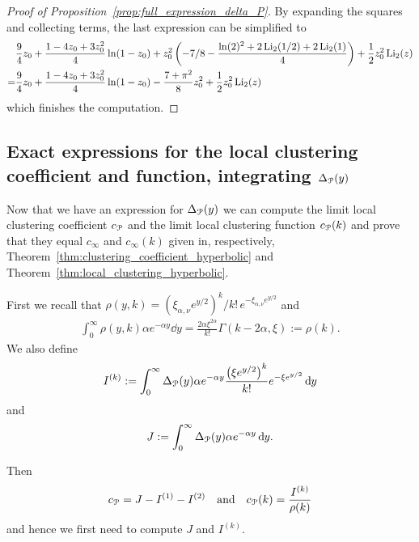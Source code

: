 \begin{proof}[Proof of Proposition~\ref{prop:full_expression_delta_P}]
By expanding the squares and collecting terms, the last expression can be simplified to
\begin{align*}
&\frac{9}{4} z_0 + \frac{1 - 4 z_0 + 3 z_0^2}{4}\ln(1 - z_0) + 
z_0^2 \left(-7/8 - \frac{\ln(2)^2+2\operatorname{Li}_2(1/2) + 2\operatorname{Li}_2(1)}{4} \right) + 
\frac{1}{2}z_0^2 \operatorname{Li}_2(z) \\
=&\frac{9}{4} z_0 + \frac{1 - 4 z_0 + 3 z_0^2}{4}\ln(1 - z_0) - \frac{7+\pi^2}{8}
z_0^2  + 
\frac{1}{2}z_0^2 \operatorname{Li}_2(z)
\end{align*}
which finishes the computation.

\end{proof}

\subsection{Exact expressions for the local clustering coefficient and function, integrating $\Delta_{{\mathcal P}}(y)$}\label{ssec:exact_expressions_clustering_P}

Now that we have an expression for $\Delta_{{\mathcal P}}(y)$ we can compute the limit local clustering coefficient $c_{{\mathcal P}}$ and the limit local clustering function $c_{{\mathcal P}}(k)$ and prove that they equal $c_\infty$ and $c_\infty(k)$ given in, respectively, Theorem~\ref{thm:clustering_coefficient_hyperbolic} and Theorem~\ref{thm:local_clustering_hyperbolic}.


First we recall that $\rho(y,k) = (\xi_{\alpha,\nu} e^{y/2})^k/k! \, e^{-\xi_{\alpha,\nu} e^{y/2}}$ and
\begin{align*}
	\int_0^\infty \rho(y,k) \alpha e^{-\alpha y} \dd y = \frac{2\alpha \xi^{2\alpha}}{k!} \Gamma(k-2\alpha,\xi)
	:= \rho(k).
\end{align*}
We also define
\[
	I^{(k)} := \int_0^{\infty} \Delta_{{\mathcal P}}(y) \alpha e^{-\alpha y} \frac{\left(\xi e^{y/2}\right)^k}{k!} e^{-\xi e^{y/2}} \operatorname{\mathrm{d}\hspace{-2pt}} y
\]
and
\[
	J := \int_0^\infty \Delta_{{\mathcal P}}(y) \alpha e^{-\alpha y} \operatorname{\mathrm{d}\hspace{-2pt}} y.
\]

Then
\[   
	c_{{\mathcal P}} = J - I^{(1)} - I^{(2)} \quad \text{and} \quad
	c_{{\mathcal P}}(k) = \frac{I^{(k)}}{\rho(k)}
\]
and hence we first need to compute $J$ and $I^{(k)}$.

